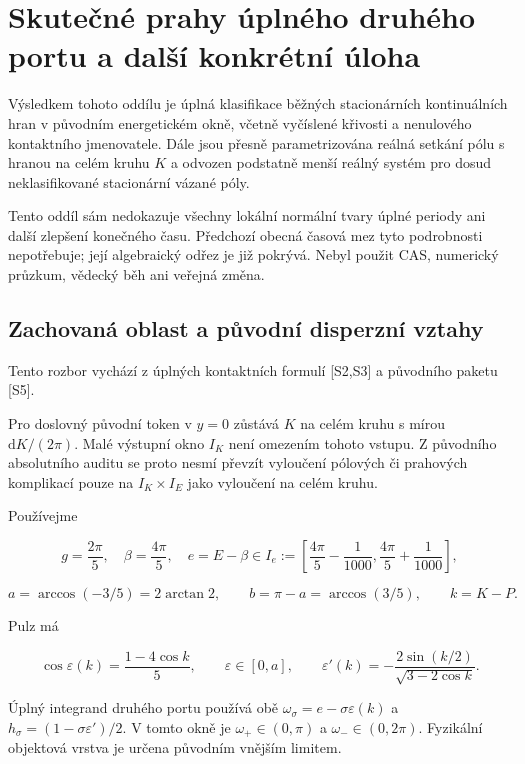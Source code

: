 \documentclass[11pt,a4paper]{article}
\theoremstyle{remark}\newtheorem{remark}[theorem]{Poznámka}
\numberwithin{equation}{section}
\begin{document}
\section{Skutečné prahy úplného druhého portu a další konkrétní úloha}
\label{sec:physical}



Výsledkem tohoto oddílu je úplná klasifikace běžných stacionárních
kontinuálních hran v původním energetickém okně, včetně vyčíslené
křivosti a nenulového kontaktního jmenovatele. Dále jsou přesně
parametrizována reálná setkání pólu s hranou na celém kruhu \(K\) a
odvozen podstatně menší reálný systém pro dosud neklasifikované
stacionární vázané póly.

Tento oddíl sám nedokazuje všechny lokální normální tvary úplné periody ani další zlepšení konečného času. Předchozí obecná časová mez tyto podrobnosti nepotřebuje; její algebraický odřez je již pokrývá. Nebyl použit CAS,
numerický průzkum, vědecký běh ani veřejná změna.

\subsection{Zachovaná oblast a původní disperzní vztahy}

Tento rozbor vychází z úplných kontaktních formulí [S2,S3] a původního paketu [S5].

Pro doslovný původní token v \(y=0\) zůstává \(K\) na celém kruhu
s mírou \(\mathrm dK/(2\pi)\). Malé výstupní okno \(I_K\) není
omezením tohoto vstupu. Z původního absolutního auditu se proto
nesmí převzít vyloučení pólových či prahových komplikací pouze na
\(I_K\times I_E\) jako vyloučení na celém kruhu.

Používejme

\[
g=\frac{2\pi}{5},\quad \beta=\frac{4\pi}{5},\quad
e=E-\beta\in I_e:=
\left[\frac{4\pi}{5}-\frac1{1000},
      \frac{4\pi}{5}+\frac1{1000}\right],
\]

\[
a=\arccos(-3/5)=2\arctan2,\qquad b=\pi-a=\arccos(3/5),
\qquad k=K-P.
\tag{PT1}
\]

Pulz má

\[
\cos\varepsilon(k)=\frac{1-4\cos k}{5},\qquad
\varepsilon\in[0,a],\qquad
\varepsilon'(k)=
-\frac{2\sin(k/2)}{\sqrt{3-2\cos k}}.
\tag{PT2}
\]

Úplný integrand druhého portu používá obě
\(\omega_\sigma=e-\sigma\varepsilon(k)\) a
\(h_\sigma=(1-\sigma\varepsilon')/2\).
V tomto okně je \(\omega_+\in(0,\pi)\) a
\(\omega_-\in(0,2\pi)\). Fyzikální objektová vrstva je určena
původním vnějším limitem.
\end{document}

